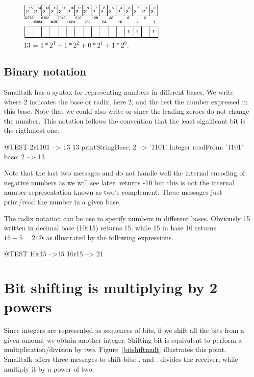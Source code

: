 \documentclass[a4paper,10pt,twoside]{book}
\begin{document}
\begin{figure}[h]
\begin{center}
\includegraphics[width=0.65\textwidth]{16bits-number13}
\caption{13 = $1*2^{3} + 1*2^{2} + 0*2^1 +1*2^{0}$.\label{16bits-number13}}
\end{center}
\end{figure}


\subsection*{Binary notation}
Smalltalk has a syntax for representing numbers in different bases. We write  where 2 indicates the base or radix, here 2, and the rest the number expressed in this base. Note that we could also write  or  since the leading zeroes do not change the number.
This notation follows the convention that the least significant bit is the rigthmost one. 

\begin{code}{@TEST}
2r1101
	--> 13
13 printStringBase: 2
	--> '1101'	
Integer readFrom: '1101' base: 2 	
	--> 13
\end{code}


Note that the last two messages  and  do not handle well the internal encoding of negative numbers as we will see later.  returns -10 but this is not the internal number representation known as two's complement. These messages just print/read the number in a given base. 

The radix notation can be use to specify numbers in different bases. Obviously 15 written in decimal base (10r15) returns 15, while 15 in base 16 returns $16 + 5 = 21@$ as illustrated by the following expressions. 

\begin{code}{@TEST}
10r15 
    -->15
16r15 
	--> 21
\end{code}



\section{Bit shifting is multiplying by 2 powers}
Since integers are represented as sequences of bits, if we shift all the bits from a given amount we obtain another integer. Shifting bit is equivalent to perform a multiplication/division by two. Figure~\ref{bitshiftmult} illustrates this point. Smalltalk offers three messages to shift bits: ,  and . \ct{>>} divides the receiver, while \ct{<<} multiply it by a power of two.
\end{document}
